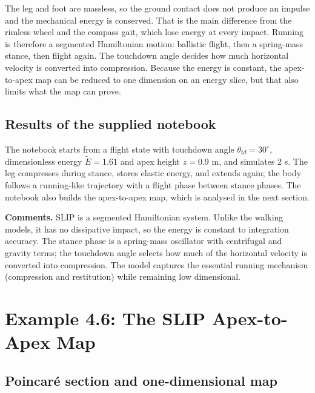\documentclass[11pt]{article}
\begin{document}
\begin{intuition}[breakable=false,title={Why SLIP is a ``conservative'' runner}]
The leg and foot are massless, so the ground contact does not produce an
impulse and the mechanical energy is conserved.  That is the main difference
from the rimless wheel and the compass gait, which lose energy at every
impact.  Running is therefore a segmented Hamiltonian motion: ballistic
flight, then a spring-mass stance, then flight again.  The touchdown angle
decides how much horizontal velocity is converted into compression.  Because
the energy is constant, the apex-to-apex map can be reduced to one dimension
on an energy slice, but that also limits what the map can prove.
\end{intuition}

\subsection{Results of the supplied notebook}

The notebook starts from a flight state with touchdown angle
$\theta_{td}=30^\circ$, dimensionless energy $\tilde E=1.61$ and apex height
$z=0.9$ m, and simulates 2 s.  The leg compresses during stance, stores elastic
energy, and extends again; the body follows a running-like trajectory with a
flight phase between stance phases.  The notebook also builds the
apex-to-apex map, which is analysed in the next section.

\textbf{Comments.}  SLIP is a segmented Hamiltonian system.  Unlike the
walking models, it has no dissipative impact, so the energy is constant to
integration accuracy.  The stance phase is a spring-mass oscillator with
centrifugal and gravity terms; the touchdown angle selects how much of the
horizontal velocity is converted into compression.  The model captures the
essential running mechanism (compression and restitution) while remaining low
dimensional.

\section{Example 4.6: The SLIP Apex-to-Apex Map}

\subsection{Poincar\'e section and one-dimensional map}
\end{document}
